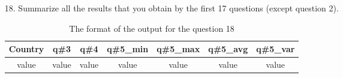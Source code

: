 \documentclass[a4 paper]{article}
\numberwithin{equation}{section}
\newcommand{\0}{\mathbf{0}}
\begin{document}
\begin{itemize}
\begin{table}[ht]
\begin{tabular}{c c c c}
			\hline %
		\end{tabular}\label{table:nonlin}%
	\end{table}
	\item[18. ] Summarize all the results that you obtain by the first 17 questions (except question 2). 
	\begin{table}[ht]
		\caption{The format of the output for the question 18} %
		\centering  %
		\begin{tabular}{c c c c c c c}%
			\hline\hline       %
			Country & q\#3 & q\#4 & q\#5\_min &  q\#5\_max & q\#5\_avg &  q\#5\_var  \\ 
			[0.5ex]%
			\hline      %
			 value & value & value & value & value & value & value\\%


\end{tabular}
\end{table}
\end{itemize}
\end{document}

